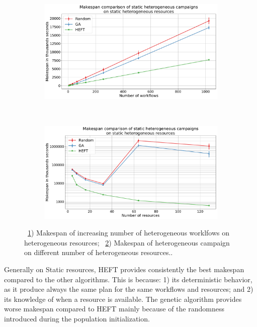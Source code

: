 \begin{figure}[ht!]
    \centering
    \begin{subfigure}[b]{0.45\textwidth}
        \includegraphics[width=.95\textwidth]{figures/campaign/StHeteroCampaigns_4StHeteroResources.pdf}
        \caption{}
        \label{fig:StHeteroCampaigns_4StHeteroResources}
    \end{subfigure}%
    ~ 
    \begin{subfigure}[b]{0.45\textwidth}
        \includegraphics[width=\linewidth]{figures/campaign/StHeteroResources_StHeteroCampaigns.pdf}
        \caption{}
        \label{fig:StHeteroResources_StHeteroCampaigns}
    \end{subfigure}
    \caption{~\ref{fig:StHeteroCampaigns_4StHeteroResources}) Makespan of increasing number of heterogeneous worklfows on heterogeneous resources;
        ~\ref{fig:StHeteroResources_StHeteroCampaigns}) Makespan of heterogeneous campaign on different number of heterogeneous resources..}
    \label{fig:heter_analysis}
\end{figure}

Generally on Static resources, HEFT provides consistently the best makespan compared to the other algorithms.
This is because: 1) its deterministic behavior, as it produce always the same plan for the same workflows and resources; and 2) its knowledge of when a resource is available.
The genetic algorithm provides worse makespan compared to HEFT mainly because of the randomness introduced during the population initialization.

